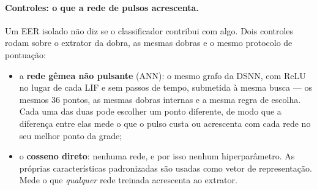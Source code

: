				\paragraph{Controles: o que a rede de pulsos acrescenta.} Um \ac{EER} isolado não diz se o classificador contribui com algo. Dois controles rodam sobre o extrator da dobra, as mesmas dobras e o mesmo protocolo de pontuação:
				\begin{itemize}
					\item a \textbf{rede gêmea não pulsante} (\ac{ANN}): o mesmo grafo da \ac{DSNN}, com ReLU no lugar de cada \ac{LIF} e sem passos de tempo, submetida à mesma busca --- os mesmos 36 pontos, as mesmas dobras internas e a mesma regra de escolha. Cada uma das duas pode escolher um ponto diferente, de modo que a diferença entre elas mede o que o pulso custa ou acrescenta com cada rede no seu melhor ponto da grade;
					\item o \textbf{cosseno direto}: nenhuma rede, e por isso nenhum hiperparâmetro. As próprias características padronizadas são usadas como vetor de representação. Mede o que \emph{qualquer} rede treinada acrescenta ao extrator.
				\end{itemize}

